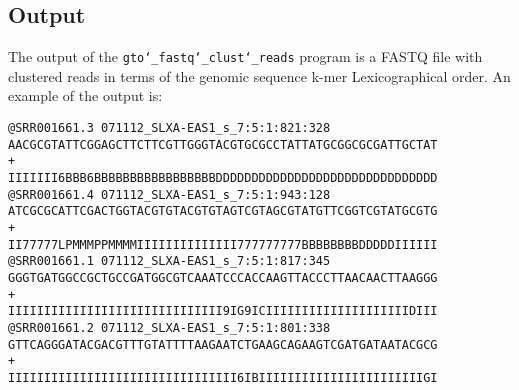 \subsection*{Output}
The output of the \texttt{gto\char`_fastq\char`_clust\char`_reads} program is a FASTQ file with clustered reads in terms of the genomic sequence k-mer Lexicographical order.
An example of the output is:
\begin{lstlisting}
@SRR001661.3 071112_SLXA-EAS1_s_7:5:1:821:328
AACGCGTATTCGGAGCTTCTTCGTTGGGTACGTGCGCCTATTATGCGGCGCGATTGCTAT
+
IIIIIII6BBB6BBBBBBBBBBBBBBBBBDDDDDDDDDDDDDDDDDDDDDDDDDDDDDDD
@SRR001661.4 071112_SLXA-EAS1_s_7:5:1:943:128
ATCGCGCATTCGACTGGTACGTGTACGTGTAGTCGTAGCGTATGTTCGGTCGTATGCGTG
+
II77777LPMMMPPMMMMIIIIIIIIIIIIII777777777BBBBBBBBDDDDDIIIIII
@SRR001661.1 071112_SLXA-EAS1_s_7:5:1:817:345
GGGTGATGGCCGCTGCCGATGGCGTCAAATCCCACCAAGTTACCCTTAACAACTTAAGGG
+
IIIIIIIIIIIIIIIIIIIIIIIIIIIIII9IG9ICIIIIIIIIIIIIIIIIIIIIDIII
@SRR001661.2 071112_SLXA-EAS1_s_7:5:1:801:338
GTTCAGGGATACGACGTTTGTATTTTAAGAATCTGAAGCAGAAGTCGATGATAATACGCG
+
IIIIIIIIIIIIIIIIIIIIIIIIIIIIIIII6IBIIIIIIIIIIIIIIIIIIIIIIIGI
\end{lstlisting}
